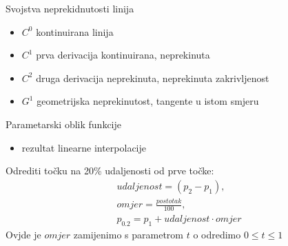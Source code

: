 \documentclass[9pt]{beamer}
\begin{document}
\begin{frame}{Svojstva neprekidnutosti linija}
	\begin{itemize}
		\item<1-> $C^{0}$ kontinuirana linija
		\item<2-> $C^{1}$ prva derivacija kontinuirana, neprekinuta
		\item<3-> $C^{2}$ druga derivacija neprekinuta, neprekinuta zakrivljenost
		\item<4-> $G^{1}$ geometrijska neprekinutost, tangente u istom smjeru
	\end{itemize}
	\begin{center}
	\end{center}
\end{frame}
\begin{frame}{Parametarski oblik funkcije}
	\begin{itemize}
		\item rezultat linearne interpolacije
	\end{itemize}
	Odrediti točku na 20\% udaljenosti od prve točke:
	\begin{align*}
		udaljenost = (p_{2} - p_{1}), \\
		omjer = \frac{postotak}{100}, \\
		p_{0.2} = p_{1} + udaljenost \cdot omjer
	\end{align*}
	Ovjde je $omjer$ zamijenimo s parametrom $t$ o odredimo $0 \leq t \leq 1$
	
\end{frame}
\end{document}
